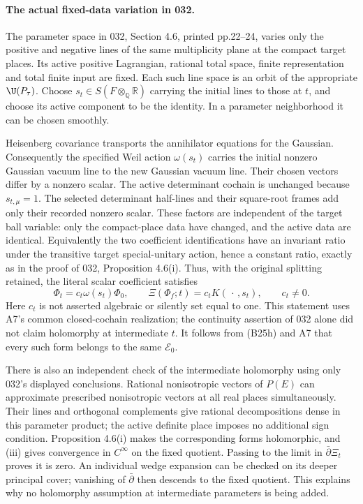 \documentclass[11pt]{article}
\newcommand{\Q}{\mathbb Q}\newcommand{\C}{\mathbb C}\newcommand{\Z}{\mathbb Z}\newcommand{\R}{\mathbb R}\newcommand{\A}{\mathbb A}\newcommand{\OO}{\mathcal O}
\theoremstyle{definition}\newtheorem{definition}[theorem]{Definition}\newtheorem{remark}[theorem]{Remark}
\begin{document}
\paragraph{The actual fixed-data variation in 032.}
The parameter space in 032, Section 4.6,
printed pp.22--24, varies only the positive
and negative lines of the same multiplicity
plane at the compact target places.  Its
active positive Lagrangian, rational total
space, finite representation and total finite
input are fixed.  Each such line space is
an orbit of the appropriate $\U(P_\tau)$.
Choose $s_t\in S(F\otimes_\Q\R)$ carrying
the initial lines to those at $t$, and choose
its active component to be the identity.
In a parameter neighborhood it can be
chosen smoothly.

Heisenberg covariance transports the
annihilator equations for the Gaussian.
Consequently the specified Weil action
$\omega(s_t)$ carries the initial nonzero
Gaussian vacuum line to the new Gaussian
vacuum line.  Their chosen vectors differ
by a nonzero scalar.  The active determinant
cochain is unchanged because $s_{t,\mu}=1$.
The selected determinant half-lines and
their square-root frames add only their
recorded nonzero scalar.  These factors
are independent of the target ball variable:
only the compact-place data have changed,
and the active data are identical.  Equivalently
the two coefficient identifications have an
invariant ratio under the transitive target
special-unitary action, hence a constant
ratio, exactly as in the proof of 032,
Proposition 4.6(i).
Thus, with the original splitting retained,
the literal scalar coefficient satisfies
\[
       \Phi_t=c_t\omega(s_t)\Phi_0,
       \qquad
       \Xi(\Phi_f;t)=c_tK(\,\cdot\,,s_t),
       \qquad c_t\ne0.
 \tag{B25h}
\]
Here $c_t$ is not asserted algebraic or
silently set equal to one.  This statement
uses A7's common closed-cochain realization;
the continuity assertion of 032 alone did
not claim holomorphy at intermediate $t$.
It follows from (B25h) and A7 that every
such form belongs to the same $\mathcal E_0$.

There is also an independent check of the
intermediate holomorphy using only 032's
displayed conclusions.  Rational nonisotropic
vectors of $P(E)$ can approximate prescribed
nonisotropic vectors at all real places
simultaneously.  Their lines and orthogonal
complements give rational decompositions
dense in this parameter product; the active
definite place imposes no additional sign
condition.  Proposition 4.6(i) makes the
corresponding forms holomorphic, and (iii)
gives convergence in $C^\infty$ on the fixed
quotient.  Passing to the limit in
$\bar\partial\Xi_t$ proves it is zero.
An individual wedge expansion can be checked
on its deeper principal cover; vanishing of
$\bar\partial$ then descends to the fixed
quotient.  This explains why no holomorphy
assumption at intermediate parameters is
being added.
\end{document}
